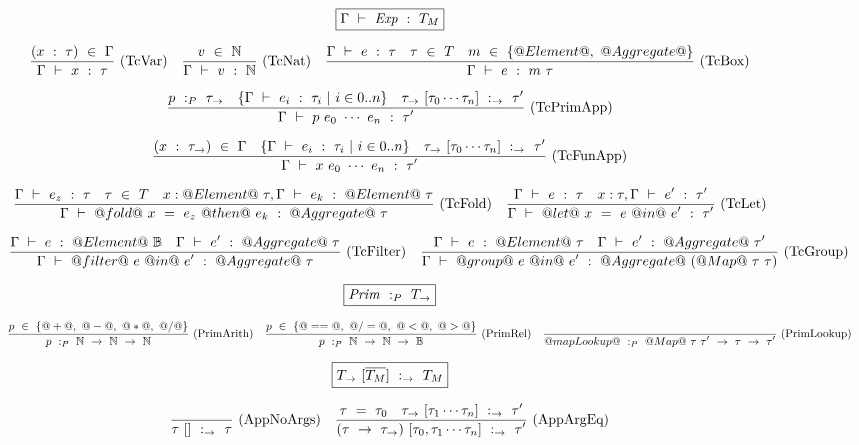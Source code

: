 
\begin{figure*}


$$
\boxed{\Gamma ~\vdash~ \mathit{Exp}~:~T_M}
$$


$$
\enskip \frac {\displaystyle 
    (x~:~\tau)~\in~\Gamma
} {\displaystyle  
    \Gamma ~\vdash~ x~:~\tau
} \  \mbox{(TcVar)} \enskip
\enskip \frac {\displaystyle 
  v~\in~\mathbb{N}
} {\displaystyle  
    \Gamma ~\vdash~ v~:~\mathbb{N}
} \  \mbox{(TcNat)} \enskip
\enskip \frac {\displaystyle 
  \Gamma ~\vdash~ e~:~\tau
  \quad
  \tau~\in~T
  \quad
  m~\in~\{@Element@,~@Aggregate@\}
} {\displaystyle  
    \Gamma ~\vdash~ e~:~m~\tau
} \  \mbox{(TcBox)} \enskip
$$

$$
\enskip \frac {\displaystyle 
    p~:_P~\tau_\to
    \quad
    \{ \Gamma ~\vdash~ e_i~:~\tau_i ~|~ i \in 0..n \}
    \quad
    \tau_\to~[\tau_0 \cdots \tau_n]~:_\to~\tau'
} {\displaystyle  
    \Gamma ~\vdash~ p~e_0~\cdots~e_n~:~\tau'
} \  \mbox{(TcPrimApp)} \enskip
$$

$$
\enskip \frac {\displaystyle 
    (x~:~\tau_\to)~\in~\Gamma
    \quad
    \{ \Gamma ~\vdash~ e_i~:~\tau_i ~|~ i \in 0..n \}
    \quad
    \tau_\to~[\tau_0 \cdots \tau_n]~:_\to~\tau'
} {\displaystyle  
    \Gamma ~\vdash~ x~e_0~\cdots~e_n~:~\tau'
} \  \mbox{(TcFunApp)} \enskip
$$

$$
\enskip \frac {\displaystyle 
  \Gamma ~\vdash~ e_z~:~\tau
  \quad
  \tau~\in~T
  \quad
  x:@Element@~\tau,\Gamma ~\vdash~ e_k~:~@Element@~\tau
} {\displaystyle 
  \Gamma ~\vdash~ @fold@~x~=~e_z~@then@~e_k~:~@Aggregate@~\tau
} \  \mbox{(TcFold)} \enskip
\enskip \frac {\displaystyle 
  \Gamma ~\vdash~ e~:~\tau
  \quad
  x:\tau,\Gamma ~\vdash~ e'~:~\tau'
} {\displaystyle 
  \Gamma ~\vdash~ @let@~x~=~e~@in@~e'~:~\tau'
} \  \mbox{(TcLet)} \enskip
$$

$$
\enskip \frac {\displaystyle 
  \Gamma ~\vdash~ e~:~@Element@~\mathbb{B}
  \quad
  \Gamma ~\vdash~ e'~:~@Aggregate@~\tau
} {\displaystyle 
  \Gamma ~\vdash~ @filter@~e~@in@~e'~:~@Aggregate@~\tau
} \  \mbox{(TcFilter)} \enskip
\enskip \frac {\displaystyle 
  \Gamma ~\vdash~ e~:~@Element@~\tau
  \quad
  \Gamma ~\vdash~ e'~:~@Aggregate@~\tau'
} {\displaystyle 
  \Gamma ~\vdash~ @group@~e~@in@~e'~:~@Aggregate@~(@Map@~\tau~\tau)
} \  \mbox{(TcGroup)} \enskip
$$


$$
\boxed{\mathit{Prim}~:_P~T_\to}
$$

$$
\enskip \frac {\displaystyle 
  p~\in~\{@+@,~@-@,~@*@,~@/@\}
} {\displaystyle 
  p~:_P~\mathbb{N}~\to~\mathbb{N}~\to~\mathbb{N}
} \  \mbox{(PrimArith)} \enskip
\enskip \frac {\displaystyle 
  p~\in~\{@==@,~@/=@,~@<@,~@>@\}
} {\displaystyle 
  p~:_P~\mathbb{N}~\to~\mathbb{N}~\to~\mathbb{B}
} \  \mbox{(PrimRel)} \enskip
\enskip \frac {\displaystyle } {\displaystyle 
  @mapLookup@~:_P~@Map@~\tau~\tau'~\to~\tau~\to~\tau'
} \  \mbox{(PrimLookup)} \enskip
$$

$$
\boxed{T_\to~[\overline{T_M}]~:_\to~T_M}
$$

$$
\enskip \frac {\displaystyle } {\displaystyle 
  \tau~[]~:_\to~\tau
} \  \mbox{(AppNoArgs)} \enskip
\enskip \frac {\displaystyle 
  \tau~=~\tau_0
  \quad
  \tau_\to~[\tau_1 \cdots \tau_n]~:_\to~\tau'
} {\displaystyle 
  (\tau~\to~\tau_\to)~[\tau_0, \tau_1 \cdots \tau_n]~:_\to~\tau'
} \  \mbox{(AppArgEq)} \enskip
$$


\end{figure*}
